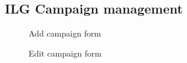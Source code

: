 \begin{appendices}
    \section{ILG Campaign management}
    \begin{figure}[H]
        \centering
        \caption*{Add campaign form}
    \end{figure}
    \begin{figure}[H]
        \centering
        \caption*{Edit campaign form}
    \end{figure}


\end{appendices}
